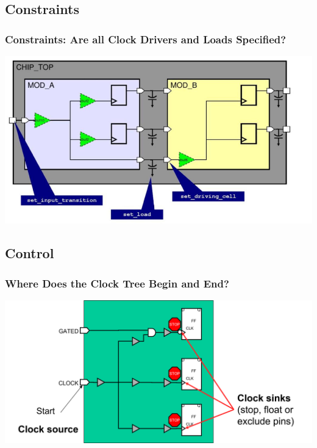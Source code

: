 \documentclass[compress]{beamer}
\begin{document}
\subsection[Cons]{Constraints}
\begin{frame}
	\frametitle{Constraints: Are all Clock Drivers and Loads Specified?}
	\begin{center}
		\includegraphics[width=\textwidth]{Constraints}
	\end{center}
\end{frame}

\subsection[Control]{Control}
\begin{frame}
	\frametitle{Where Does the Clock Tree Begin and End?}
	\begin{center}
		\includegraphics[width=\textwidth]{Start}
	\end{center}
\end{frame}
\end{document}
